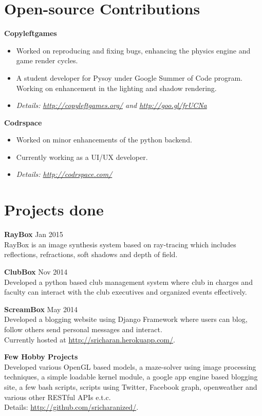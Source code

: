 \documentclass[margin]{res}
\begin{document}
\begin{resume}
\section{Open-source Contributions}
{\bf Copyleftgames} \begin{itemize} \item Worked on reproducing and fixing bugs, enhancing the physics engine and game render cycles. \item A student developer for Pysoy under Google Summer of Code program. Working on enhancement in the lighting and shadow rendering.\item {\sl Details: \underline{http://copyleftgames.org/} and \underline{http://goo.gl/frUCNa}} \end{itemize}

{\bf Codrspace} \begin{itemize} \item Worked on minor enhancements of the python backend.\item Currently working as a UI/UX developer.  \item {\sl Details: \underline{http://codrspace.com/}} \end{itemize}


 \section{Projects done}
{\bf RayBox} \hfill Jan 2015 \\ RayBox is an image synthesis system based on ray-tracing which includes reflections, refractions, soft shadows and depth of field.

{\bf ClubBox} \hfill Nov 2014 \\ Developed a python based club management system where club in 
charges and faculty can interact with the club executives and organized events effectively.

{\bf ScreamBox} \hfill May 2014 \\ Developed a blogging website using Django Framework where users can blog, follow others send personal messages and interact.\\ Currently hosted at \underline{http://sricharan.herokuapp.com/}.

{\bf Few Hobby Projects} \\ Developed various OpenGL based models, a maze-solver using image processing techniques, a simple loadable kernel module, a google app engine based blogging site, a few bash scripts, scripts using Twitter, Facebook graph, openweather and various other RESTful APIs e.t.c. \\Details: \underline{http://github.com/sricharanized/}.


\end{resume}
\end{document}
